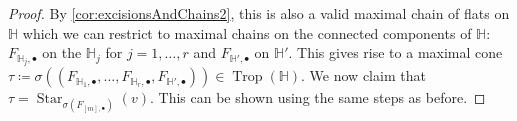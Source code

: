 \documentclass[11pt,reqno,a4paper]{amsart}
\theoremstyle{theoremstyle}
\theoremstyle{examplestyle}
\theoremstyle{algorithmstyle}
\newcommand{\EE}{\mathbb{E}}
\newcommand{\ee}{\mathbbm{e}}
\newcommand{\GG}{\mathbb{G}}
\newcommand{\HH}{\mathbb{H}}
\newcommand{\bbone}{\mathbbm{1}}
\DeclareMathOperator{\Trop}{Trop}
\DeclareMathOperator{\rank}{rank}
\DeclareMathOperator{\Star}{Star}
\begin{document}
\begin{proof}
  By \cref{cor:excisionsAndChains2}, this is also a valid maximal chain of flats on $\HH$ which we can restrict to maximal chains on the connected components of $\HH$: $F_{\HH_j,\bullet}$ on the $\HH_j$ for $j=1,\dots,r$ and $F_{\HH',\bullet}$ on $\HH'$.  This gives rise to a maximal cone $\tau\coloneqq \sigma((F_{\HH_1,\bullet},\dots,F_{\HH_r,\bullet},F_{\HH',\bullet}))\in\Trop(\HH)$.  We now claim that $\tau=\Star_{\sigma(F_{[m],\bullet})}(v)$.  This can be shown using the same steps as before.
\end{proof}
\end{document}

